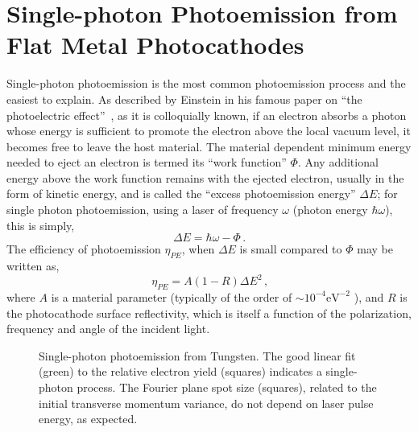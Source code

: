 
\section{Single-photon Photoemission from Flat Metal Photocathodes} \label{sec:single_photon}

Single-photon photoemission is the most common photoemission process and the easiest to explain.
As described by Einstein in his famous paper on ``the photoelectric effect''~\cite{einstein_uber_1905}, as it is colloquially known, if an electron absorbs a photon whose energy is sufficient to promote the electron above the local vacuum level, it becomes free to leave the host material.
The material dependent minimum energy needed to eject an electron is termed its ``work function'' $\Phi$.
Any additional energy above the work function remains with the ejected electron, usually in the form of kinetic energy, and is called the ``excess photoemission energy'' $\Delta E$; for single photon photoemission, using a laser of frequency $\omega$ (photon energy $\hbar \omega$), this is simply,
\begin{equation}
  \Delta E = \hbar \omega - \Phi \,\text{.}
\end{equation}
The efficiency of photoemission $\eta_{{\scriptscriptstyle PE}}$, when $\Delta E$ is small compared to $\Phi$ may be written as, %
\begin{equation}
  \eta_{{\scriptscriptstyle PE}} = A ( 1 - R ) \Delta E^2 \,\text{,}
\end{equation}
where $A$ is a material parameter (typically of the order of $\sim 10^{-4} \text{eV}^{-2}$ %
), and $R$ is the photocathode surface reflectivity, which is itself a function of the polarization, frequency and angle of the incident light.

\begin{figure}
  \centering
  
  \caption[Single-photon photoemission from Tungsten]{
    Single-photon photoemission from Tungsten.
    The good linear fit (green) to the relative electron yield (squares) indicates a single-photon process.
    The Fourier plane spot size (squares), related to the initial transverse momentum variance, do not depend on laser pulse energy, as expected.
  }
  \label{fig:single_photon_tungsten}
\end{figure}

